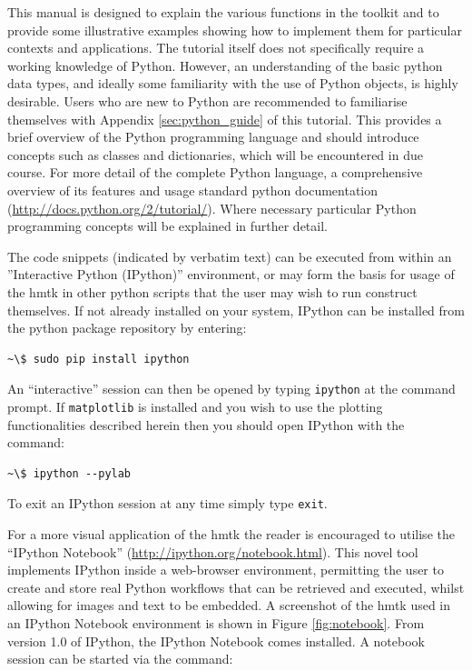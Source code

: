 This manual is designed to explain the various functions in the toolkit and to provide some illustrative examples showing how to implement them for particular contexts and applications. The tutorial itself does not specifically require a working knowledge of Python. However, an understanding of the basic python data types, and ideally some familiarity with the use of Python objects, is highly desirable. Users who are new to Python are recommended to familiarise themselves with Appendix \ref{sec:python_guide} of this tutorial. This provides a brief overview of the Python programming language and should introduce concepts such as classes and dictionaries, which will be encountered in due course. For more detail of the complete Python language, a comprehensive overview of its features and usage standard python documentation (\href{http://docs.python.org/2/tutorial/}{http://docs.python.org/2/tutorial/}). Where necessary particular Python programming concepts will be explained in further detail.

The code snippets (indicated by verbatim text) can be executed from within an ''Interactive Python (IPython)'' environment, or may form the basis for usage of the hmtk in other python scripts that the user may wish to run construct themselves. If not already installed on your system, IPython can be installed from the python package repository by entering: 

\begin{Verbatim}[frame=single, commandchars=\\\{\}, fontsize=\scriptsize]
~\$ sudo pip install ipython
\end{Verbatim}

An ``interactive'' session can then be opened by typing \verb=ipython= at the command prompt. If \verb=matplotlib= is installed and you wish to use the plotting functionalities described herein then you should open IPython with the command:

\begin{Verbatim}[frame=single, commandchars=\\\{\}, fontsize=\scriptsize]
~\$ ipython --pylab
\end{Verbatim}

To exit an IPython session at any time simply type \verb=exit=.

For a more visual application of the hmtk the reader is encouraged to utilise the ``IPython Notebook'' (\href{http://ipython.org/notebook.html}{http://ipython.org/notebook.html}). This novel tool implements IPython inside a web-browser environment, permitting the user to create and store real Python workflows that can be retrieved and executed, whilst allowing for images and text to be embedded. A screenshot of the hmtk used in an IPython Notebook environment is shown in Figure \ref{fig:notebook}. From version 1.0 of IPython, the IPython Notebook comes installed. A notebook session can be
started via the command:

